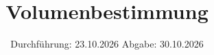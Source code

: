 


\subject{v100}
\title{Volumenbestimmung}
\date{%
  Durchführung: 23.10.2026
  \hspace{3em}
  Abgabe: 30.10.2026
}



\maketitle
\thispagestyle{empty}
\tableofcontents
\newpage






\printbibliography{}




